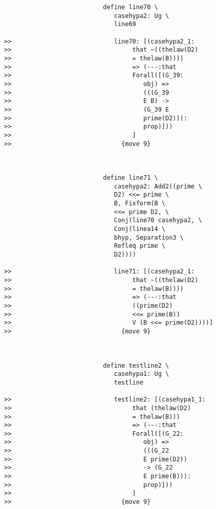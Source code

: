 \documentclass[12pt]{article}
\begin{document}
\begin{verbatim}
                           define line70 \
                              casehypa2: Ug \
                              line69

>>                            line70: [(casehypa2_1:
>>                                 that ~((thelaw(D2)
>>                                 = thelaw(B))))
>>                                 => (---:that
>>                                 Forall([(G_39:
>>                                    obj) =>
>>                                    (((G_39
>>                                    E B) ->
>>                                    (G_39 E
>>                                    prime(D2))):
>>                                    prop)]))
>>                                 ]
>>                              {move 9}



                           define line71 \
                              casehypa2: Add2((prime \
                              D2) <<= prime \
                              B, Fixform(B \
                              <<= prime D2, \
                              Conj(line70 casehypa2, \
                              Conj(linea14 \
                              bhyp, Separation3 \
                              Refleq prime \
                              D2))))

>>                            line71: [(casehypa2_1:
>>                                 that ~((thelaw(D2)
>>                                 = thelaw(B))))
>>                                 => (---:that
>>                                 ((prime(D2)
>>                                 <<= prime(B))
>>                                 V (B <<= prime(D2))))]
>>                              {move 9}



                           define testline2 \
                              casehypa1: Ug \
                              testline

>>                            testline2: [(casehypa1_1:
>>                                 that (thelaw(D2)
>>                                 = thelaw(B)))
>>                                 => (---:that
>>                                 Forall([(G_22:
>>                                    obj) =>
>>                                    (((G_22
>>                                    E prime(D2))
>>                                    -> (G_22
>>                                    E prime(B))):
>>                                    prop)]))
>>                                 ]
>>                              {move 9}




\end{verbatim}
\end{document}
